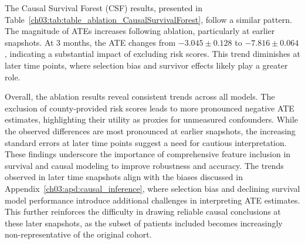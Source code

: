 The Causal Survival Forest (CSF) results, presented in Table~\ref{ch03:tab:table_ablation_CausalSurvivalForest}, follow a similar pattern.
The magnitude of ATEs increases following ablation, particularly at earlier snapshots.
At 3 months, the ATE changes from \(-3.045 \pm 0.128\) to \(-7.816 \pm 0.064\), indicating a substantial impact of excluding risk scores.
This trend diminishes at later time points, where selection bias and survivor effects likely play a greater role.

Overall, the ablation results reveal consistent trends across all models.
The exclusion of county-provided risk scores leads to more pronounced negative ATE estimates, highlighting their utility as proxies for unmeasured confounders.
While the observed differences are most pronounced at earlier snapshots, the increasing standard errors at later time points suggest a need for cautious interpretation.
These findings underscore the importance of comprehensive feature inclusion in survival and causal modeling to improve robustness and accuracy.
The trends observed in later time snapshots align with the biases discussed in Appendix~\ref{ch03:apd:causal_inference}, where selection bias and declining survival model performance introduce additional challenges in interpreting ATE estimates.
This further reinforces the difficulty in drawing reliable causal conclusions at these later snapshots, as the subset of patients included becomes increasingly non-representative of the original cohort.




























